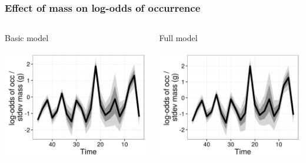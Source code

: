\documentclass{beamer}
\begin{document}
\begin{frame}
  \frametitle{Effect of mass on log-odds of occurrence}
  \begin{columns}
    \begin{column}{0.5\textwidth}
      Basic model
      \vspace*{0.05\textheight}

      \includegraphics[height=\textheight,width=\textwidth,keepaspectratio=true]{figure/mass_eff_basic}
    \end{column}
    \begin{column}{0.5\textwidth}
      Full model
      \vspace*{0.05\textheight}

      \includegraphics[height=\textheight,width=\textwidth,keepaspectratio=true]{figure/mass_eff_full}
    \end{column}
  \end{columns}
\end{frame}
\end{document}
